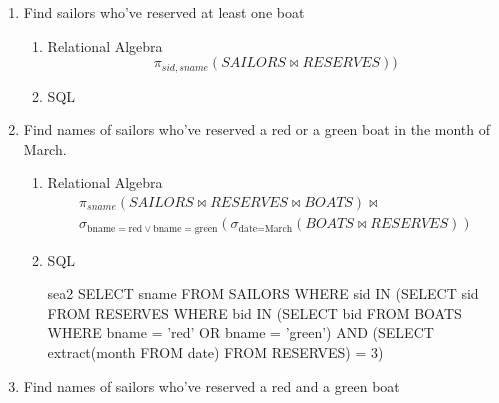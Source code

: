 \begin{enumerate}
      \item  Find sailors who've reserved at least one boat
            \begin{enumerate}
                  \item Relational Algebra
                        \begin{equation*}
                              \pi_{sid, sname}(SAILORS \bowtie RESERVES))
                        \end{equation*}

                  \item  SQL \linebreak {}
            \end{enumerate}
            \vspace{1cm}

      \item Find names of sailors who've reserved a red or a green boat in the month of March.
            \begin{enumerate}
                  \item Relational Algebra
                        \begin{multline*}
                              \pi_{sname}(SAILORS \bowtie RESERVES \bowtie BOATS) \bowtie \\
                              \sigma_{\text{bname} = \text{red} \lor \text{bname} = \text{green}}(\sigma_{\text{date} = \text{March}}(BOATS \bowtie RESERVES))
                        \end{multline*}

                  \item  SQL
                        \begin{sqlQuery}{sea2}
                            SELECT sname
                            FROM SAILORS
                            WHERE sid IN
                                (SELECT sid
                                FROM RESERVES
                                WHERE bid IN
                                    (SELECT bid
                                    FROM BOATS
                                    WHERE bname = 'red' OR bname = 'green')
                                AND (SELECT extract(month FROM date) FROM RESERVES) = 3)
                    \end{sqlQuery}

            \end{enumerate}

      \item  Find names of sailors who've reserved a red and a green boat


\end{enumerate}
